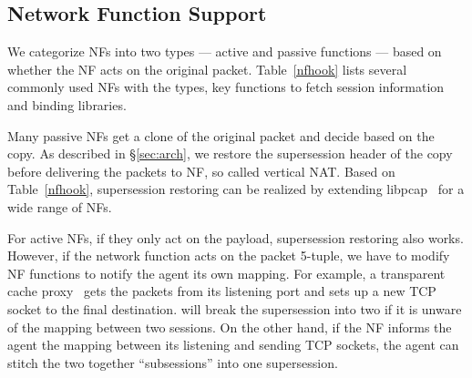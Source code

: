 \subsection{Network Function Support}\label{sec:NFsupport}

We categorize NFs into two types --- active and passive functions --- based on whether the NF acts on the original packet. Table~\ref{nfhook} lists several commonly used NFs with the types, key functions to fetch session information and binding libraries. 

 Many passive NFs get a clone of the original packet and decide based on the copy. As described in \S\ref{sec:arch}, we restore the supersession header of the copy before delivering the packets to NF, so called vertical NAT. Based on Table~\ref{nfhook}, supersession restoring can be realized by extending libpcap~\cite{tcpdump} for a wide range of NFs. 



For active NFs, if they only act on the payload, supersession restoring also works. 
However, if the network function acts on the packet 5-tuple, we have to modify NF functions to notify the \system agent its own mapping. 
For example, a transparent cache proxy~\cite{squid} gets the packets from its listening port and sets up a new TCP socket to the final destination. \system will break the supersession into two if it is unware of the mapping between two sessions. On the other hand, if the NF informs the \system agent the mapping between its listening and sending TCP sockets, the \system agent can stitch the two together ``subsessions'' into one supersession. 
 


